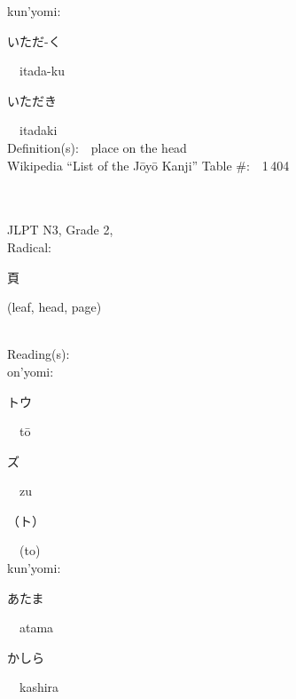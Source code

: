 \begin{multicols}{2}
{\hspace*{1em}}kun'yomi:\ \ \\
{\hspace*{2em}}{\begin{CJK}{UTF8}{min} いただ-く \end{CJK}}\ \ itada-ku\ \ \\
{\hspace*{2em}}{\begin{CJK}{UTF8}{min} いただき \end{CJK}}\ \ itadaki\ \ \\
Definition(s):\ \ place on the head \\
Wikipedia ``List of the J\=oy\=o Kanji'' Table \#:\ \ 1\,404 \\
\ \ \\
{\fontsize{34pt}{40pt}  }\ \ \\  %
{JLPT N3, Grade 2, \\Radical:\ \ {\begin{CJK}{UTF8}{min} 頁 \end{CJK}} (leaf, head, page) } \\
Reading(s):\ \ \\
{\hspace*{1em}}on'yomi:\ \ \\
{\hspace*{2em}}{\begin{CJK}{UTF8}{min} トウ \end{CJK}}\ \ t\=o\ \ \\
{\hspace*{2em}}{\begin{CJK}{UTF8}{min} ズ \end{CJK}}\ \ zu\ \ \\
{\hspace*{2em}}{\begin{CJK}{UTF8}{min} （ト） \end{CJK}}\ \ (to)\ \ \\
{\hspace*{1em}}kun'yomi:\ \ \\
{\hspace*{2em}}{\begin{CJK}{UTF8}{min} あたま \end{CJK}}\ \ atama\ \ \\
{\hspace*{2em}}{\begin{CJK}{UTF8}{min} かしら \end{CJK}}\ \ kashira\ \ \\

\end{multicols}

